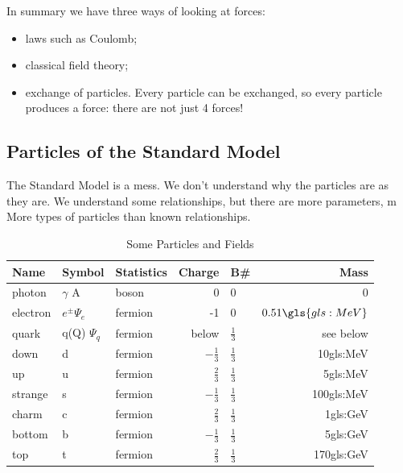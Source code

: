 \documentclass[]{article}
\begin{document}
In summary we have three ways of looking at forces:

\begin{itemize}
	\item laws such as Coulomb;
	\item classical field theory;
	\item exchange of particles. Every particle can be exchanged, so every particle produces a force: there are not just 4 forces! 
\end{itemize}

\subsection{Particles of the Standard Model}

The Standard Model is a mess. We don't understand why the particles are as they are. We understand some relationships, but there are more parameters, m More types of particles than known relationships.

\begin{table}[H]
	\begin{center}
		\caption{Some Particles and Fields}
		\begin{tabular}{|l|l|l|r|l|r|}\hline
			\textbf{Name}&\textbf{Symbol}&\textbf{Statistics}&\textbf{Charge}&\textbf{B\#}&\textbf{Mass}\\ \hline
			photon&$\gamma$ A&boson&0&0&0 \\ \hline
			electron&$e^\pm \Psi_e$&fermion&-1&0&$0.51\gls{gls:MeV}$\\ \hline
			quark&q(Q) $\Psi_q$&fermion&below&$\frac{1}{3}$&see below\\ \hline
			down&d&fermion&$-\frac{1}{3}$&$\frac{1}{3}$&10\gls{gls:MeV}\\ 
			up&u&fermion&$\frac{2}{3}$&$\frac{1}{3}$&5\gls{gls:MeV}\\ \hline
			strange&s&fermion&$-\frac{1}{3}$&$\frac{1}{3}$&100\gls{gls:MeV}\\ 
			charm&c&fermion&$\frac{2}{3}$&$\frac{1}{3}$&1\gls{gls:GeV}\\ \hline
			bottom&b&fermion&$-\frac{1}{3}$&$\frac{1}{3}$&5\gls{gls:GeV}\\ 
			top&t&fermion&$\frac{2}{3}$&$\frac{1}{3}$&170\gls{gls:GeV}\\ \hline
		\end{tabular}
	\end{center}
\end{table}
\end{document}
